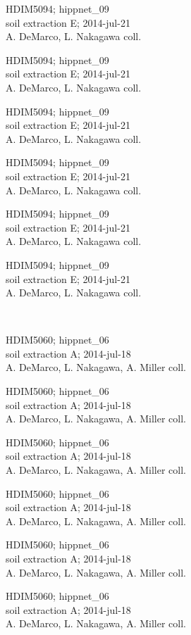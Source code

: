 \documentclass[2pt]{extarticle}
\begin{document}
\noindent
\parbox{0.16\textwidth}{\tiny \raggedright \rule[-0.3\baselineskip]{0pt}{10pt}HDIM5094; hippnet\_09\\ soil extraction E; 2014-jul-21\\ A. DeMarco, L. Nakagawa coll.}
\parbox{0.16\textwidth}{\tiny \raggedright \rule[-0.3\baselineskip]{0pt}{10pt}HDIM5094; hippnet\_09\\ soil extraction E; 2014-jul-21\\ A. DeMarco, L. Nakagawa coll.}
\parbox{0.16\textwidth}{\tiny \raggedright \rule[-0.3\baselineskip]{0pt}{10pt}HDIM5094; hippnet\_09\\ soil extraction E; 2014-jul-21\\ A. DeMarco, L. Nakagawa coll.}
\parbox{0.16\textwidth}{\tiny \raggedright \rule[-0.3\baselineskip]{0pt}{10pt}HDIM5094; hippnet\_09\\ soil extraction E; 2014-jul-21\\ A. DeMarco, L. Nakagawa coll.}
\parbox{0.16\textwidth}{\tiny \raggedright \rule[-0.3\baselineskip]{0pt}{10pt}HDIM5094; hippnet\_09\\ soil extraction E; 2014-jul-21\\ A. DeMarco, L. Nakagawa coll.}
\parbox{0.16\textwidth}{\tiny \raggedright \rule[-0.3\baselineskip]{0pt}{10pt}HDIM5094; hippnet\_09\\ soil extraction E; 2014-jul-21\\ A. DeMarco, L. Nakagawa coll.} \\ 
\vspace{0.001in} 

\noindent
\parbox{0.16\textwidth}{\tiny \raggedright \rule[-0.3\baselineskip]{0pt}{10pt}HDIM5060; hippnet\_06\\ soil extraction A; 2014-jul-18\\ A. DeMarco, L. Nakagawa, A. Miller coll.}
\parbox{0.16\textwidth}{\tiny \raggedright \rule[-0.3\baselineskip]{0pt}{10pt}HDIM5060; hippnet\_06\\ soil extraction A; 2014-jul-18\\ A. DeMarco, L. Nakagawa, A. Miller coll.}
\parbox{0.16\textwidth}{\tiny \raggedright \rule[-0.3\baselineskip]{0pt}{10pt}HDIM5060; hippnet\_06\\ soil extraction A; 2014-jul-18\\ A. DeMarco, L. Nakagawa, A. Miller coll.}
\parbox{0.16\textwidth}{\tiny \raggedright \rule[-0.3\baselineskip]{0pt}{10pt}HDIM5060; hippnet\_06\\ soil extraction A; 2014-jul-18\\ A. DeMarco, L. Nakagawa, A. Miller coll.}
\parbox{0.16\textwidth}{\tiny \raggedright \rule[-0.3\baselineskip]{0pt}{10pt}HDIM5060; hippnet\_06\\ soil extraction A; 2014-jul-18\\ A. DeMarco, L. Nakagawa, A. Miller coll.}
\parbox{0.16\textwidth}{\tiny \raggedright \rule[-0.3\baselineskip]{0pt}{10pt}HDIM5060; hippnet\_06\\ soil extraction A; 2014-jul-18\\ A. DeMarco, L. Nakagawa, A. Miller coll.} \\ 
\vspace{0.001in} 
\end{document}
